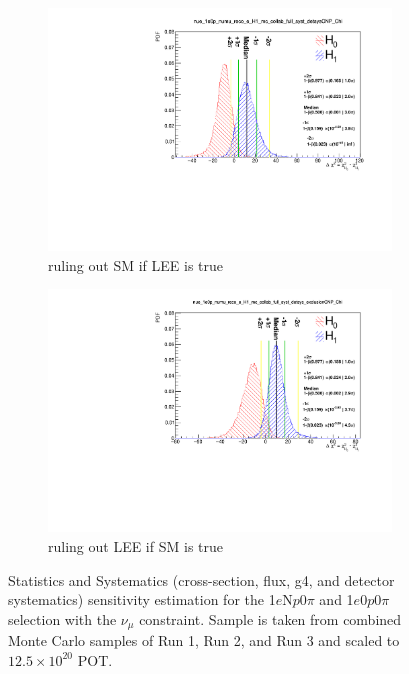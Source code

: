 \documentclass[a4paper]{article}
\newcommand{\numu}{$\nu_{\mu}$\xspace}
\newcommand{\npsel}{1$e$N$p$0$\pi$\xspace}
\newcommand{\zpsel}{1$e$0$p$0$\pi$\xspace}
\begin{document}
\begin{figure}[H]
    \centering
    \begin{subfigure}[b]{0.48\textwidth}
    \centering
    \includegraphics[width=1.00\textwidth]{Sensitivity/sensitivity-run12345/SBNfit_Cls_nue_1e0p_numu_reco_e_H1_mc_collab_full_syst_detsysCNP_Chi.pdf}
    \caption{ruling out SM if LEE is true}
    \end{subfigure}
    \begin{subfigure}[b]{0.48\textwidth}
    \centering
    \includegraphics[width=1.00\textwidth]{Sensitivity/sensitivity-run12345/SBNfit_Cls_nue_1e0p_numu_reco_e_H1_mc_collab_full_syst_detsys_exclusionCNP_Chi.pdf}
    \caption{ruling out LEE if SM is true}
    \end{subfigure}
    \caption{Statistics and Systematics (cross-section, flux, g4, and detector systematics) sensitivity estimation for the \npsel and \zpsel selection with the \numu constraint. Sample is taken from combined Monte Carlo samples of Run 1, Run 2, and Run 3 and scaled to $12.5\times10^20$ POT.}
    \label{fig:1eNp:BDT:statsystsensitivity}
\end{figure}
\end{document}
